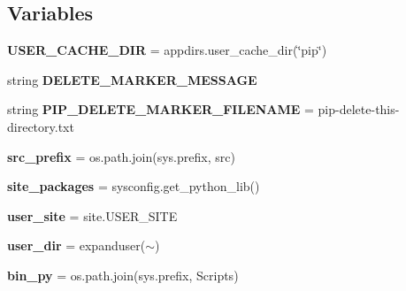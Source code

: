\subsection*{Variables}
\begin{DoxyCompactItemize}
\item 
\mbox{\label{namespacepip_1_1locations_a0be7611a57b34e53752d2ddd79d389cb}} 
{\bfseries U\+S\+E\+R\+\_\+\+C\+A\+C\+H\+E\+\_\+\+D\+IR} = appdirs.\+user\+\_\+cache\+\_\+dir(\char`\"{}pip\char`\"{})
\item 
string {\bfseries D\+E\+L\+E\+T\+E\+\_\+\+M\+A\+R\+K\+E\+R\+\_\+\+M\+E\+S\+S\+A\+GE}
\item 
\mbox{\label{namespacepip_1_1locations_a07c6a7312b1e20de7d14f1d276346c1c}} 
string {\bfseries P\+I\+P\+\_\+\+D\+E\+L\+E\+T\+E\+\_\+\+M\+A\+R\+K\+E\+R\+\_\+\+F\+I\+L\+E\+N\+A\+ME} = \textquotesingle{}pip-\/delete-\/this-\/directory.\+txt\textquotesingle{}
\item 
\mbox{\label{namespacepip_1_1locations_a2dbd838e1265d5a1cdf6315d8d7aded8}} 
{\bfseries src\+\_\+prefix} = os.\+path.\+join(sys.\+prefix, \textquotesingle{}src\textquotesingle{})
\item 
\mbox{\label{namespacepip_1_1locations_a14389e608810b11be740eb23b5f9e5c4}} 
{\bfseries site\+\_\+packages} = sysconfig.\+get\+\_\+python\+\_\+lib()
\item 
\mbox{\label{namespacepip_1_1locations_a713470e148a114c8a5354caa1350b563}} 
{\bfseries user\+\_\+site} = site.\+U\+S\+E\+R\+\_\+\+S\+I\+TE
\item 
\mbox{\label{namespacepip_1_1locations_a4919dd9f75232e5206a115747bf623b8}} 
{\bfseries user\+\_\+dir} = expanduser(\textquotesingle{}$\sim$\textquotesingle{})
\item 
\mbox{\label{namespacepip_1_1locations_a17ffe3d265c7e1606bdcd5ca87120b16}} 
{\bfseries bin\+\_\+py} = os.\+path.\+join(sys.\+prefix, \textquotesingle{}Scripts\textquotesingle{})
\item 
\mbox{\label{namespacepip_1_1locations_a273b80f5578ac16ca7f3187bdeee0b5c}} 

\end{DoxyCompactItemize}
